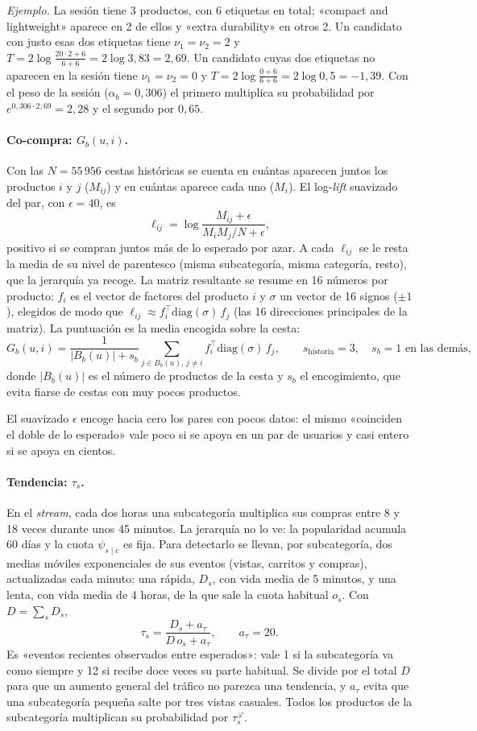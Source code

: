 \documentclass[11pt,a4paper]{article}
\begin{document}
\emph{Ejemplo.} La sesión tiene 3 productos, con 6 etiquetas en total; «compact and lightweight» aparece
en 2 de ellos y «extra durability» en otros 2. Un candidato con justo esas dos etiquetas tiene
$\nu_1=\nu_2=2$ y
$T=2\log\frac{20\cdot2+6}{6+6}=2\log 3{,}83=2{,}69$. Un candidato cuyas dos etiquetas no aparecen en
la sesión tiene $\nu_1=\nu_2=0$ y $T=2\log\frac{0+6}{6+6}=2\log 0{,}5=-1{,}39$. Con el peso de
la sesión ($\alpha_b=0{,}306$) el primero multiplica su probabilidad por $e^{0{,}306\cdot2{,}69}=2{,}28$ y el
segundo por $0{,}65$.

\paragraph{Co-compra: $G_b(u,i)$.} Con las $N=55\,956$ cestas históricas se cuenta en cuántas aparecen
juntos los productos $i$ y $j$ ($M_{ij}$) y en cuántas aparece cada uno ($M_i$). El log-\emph{lift}
suavizado del par, con $\epsilon=40$, es
\[
\ell_{ij}=\log\frac{M_{ij}+\epsilon}{M_iM_j/N+\epsilon},
\]
positivo si se compran juntos más de lo esperado por azar. A cada $\ell_{ij}$ se le resta la media de su
nivel de parentesco (misma subcategoría, misma categoría, resto), que la jerarquía ya recoge. La matriz
resultante se resume en 16 números por producto: $f_i$ es el vector de factores del producto $i$ y
$\sigma$ un vector de 16 signos ($\pm1$), elegidos de modo que
$\ell_{ij}\approx f_i^{\top}\mathrm{diag}(\sigma)\,f_j$ (las 16 direcciones principales de la matriz). La
puntuación es la media encogida sobre la cesta:
\[
G_b(u,i)=\frac{1}{|B_b(u)|+s_b}\sum_{j\in B_b(u),\,j\neq i} f_i^{\top}\mathrm{diag}(\sigma)\,f_j ,
\qquad s_{\text{historia}}=3,\quad s_b=1\text{ en las demás},
\]
donde $|B_b(u)|$ es el número de productos de la cesta y $s_b$ el encogimiento, que evita fiarse de
cestas con muy pocos productos.

El suavizado $\epsilon$ encoge hacia cero los pares con pocos datos: el mismo «coinciden el doble de lo
esperado» vale poco si se apoya en un par de usuarios y casi entero si se apoya en cientos.

\paragraph{Tendencia: $\tau_s$.} En el \emph{stream}, cada dos horas una subcategoría multiplica sus
compras entre 8 y 18 veces durante unos 45 minutos. La jerarquía no lo ve: la popularidad acumula 60 días
y la cuota $\psi_{s\mid c}$ es fija. Para detectarlo se llevan, por subcategoría, dos medias móviles
exponenciales de sus eventos (vistas, carritos y compras), actualizadas cada minuto: una rápida, $D_s$,
con vida media de 5 minutos, y una lenta, con vida media de 4 horas, de la que sale la cuota habitual
$o_s$. Con $D=\sum_s D_s$,
\[
\tau_s=\frac{D_s+a_\tau}{D\,o_s+a_\tau},\qquad a_\tau=20 .
\]
Es «eventos recientes observados entre esperados»: vale 1 si la subcategoría va como siempre y 12 si
recibe doce veces su parte habitual. Se divide por el total $D$ para que un aumento general del tráfico
no parezca una tendencia, y $a_\tau$ evita que una subcategoría pequeña salte por tres vistas casuales.
Todos los productos de la subcategoría multiplican su probabilidad por $\tau_s^{\,\varphi}$.
\end{document}
